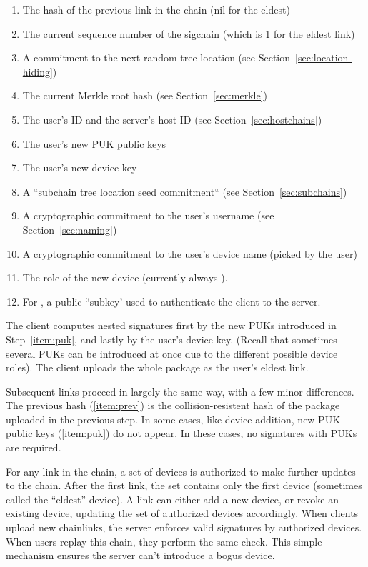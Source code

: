 \begin{enumerate}[label=U.\arabic*]\itemsep0em
    \item \label{item:prev} The hash of the previous link in the chain (nil for the eldest)
    \item The current sequence number of the sigchain (which is 1 for the eldest link)
    \item A commitment to the next random tree location (see Section~\ref{sec:location-hiding})
    \item The current Merkle root hash (see Section~\ref{sec:merkle})
    \item The user's ID and the server's host ID (see Section~\ref{sec:hostchains})
    \item \label{item:puk} The user's new PUK public keys
    \item The user's new device key
    \item A ``subchain tree location seed commitment`` (see Section~\ref{sec:subchains})
      \label{item:stlsc}
    \item A cryptographic commitment to the user's username (see Section~\ref{sec:naming})
       \label{item:name}
    \item A cryptographic commitment to the user's device name (picked by the user)
    \item The role of the new device (currently always \owner ).
    \item For \yubis , a public ``subkey' used to authenticate the client
      to the server.
\end{enumerate}

The client computes nested signatures first by the new PUKs introduced in
Step~\ref{item:puk}, and lastly by the user's device key. (Recall that sometimes
several PUKs can be introduced at once due to the different possible device
roles). The client uploads the whole package as the user's eldest link.

Subsequent links proceed in largely the same way, with a few minor differences.
The previous hash (\ref{item:prev}) is the collision-resistent hash of the 
package uploaded in the previous step. In some cases, like device addition,
new PUK public keys (\ref{item:puk}) do not appear. In these cases,
no signatures with PUKs are required.

For any link in the chain, a set of devices is authorized to make further
updates to the chain. After the first link, the set contains only the first
device (sometimes called the ``eldest'' device). A link can either add a new
device, or revoke an existing device, updating the set of authorized devices
accordingly. When clients upload new chainlinks, the server enforces valid
signatures by authorized devices. When users replay this chain, they perform the
same check. This simple mechanism ensures the server can't introduce a bogus
device.

